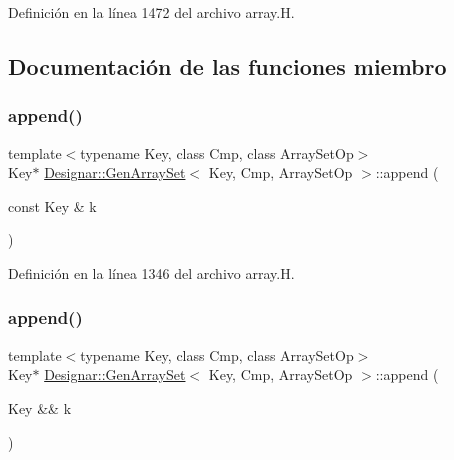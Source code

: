 Definición en la línea 1472 del archivo array.\+H.



\subsection{Documentación de las funciones miembro}
\mbox{\label{class_designar_1_1_gen_array_set_ac1367b0dd7bc3f90fc73101991dc398a}} 
\subsubsection{\texorpdfstring{append()}{append()}\hspace{0.1cm}{\footnotesize\ttfamily [1/2]}}
{\footnotesize\ttfamily template$<$typename Key, class Cmp, class Array\+Set\+Op$>$ \\
Key$\ast$ \hyperlink{class_designar_1_1_gen_array_set}{Designar\+::\+Gen\+Array\+Set}$<$ Key, Cmp, Array\+Set\+Op $>$\+::append (\begin{DoxyParamCaption}\item[{const Key \&}]{k }\end{DoxyParamCaption})\hspace{0.3cm}{\ttfamily [inline]}}



Definición en la línea 1346 del archivo array.\+H.

\mbox{\label{class_designar_1_1_gen_array_set_aafb9d33d1a9a6f5b07d434705290b7bc}} 
\subsubsection{\texorpdfstring{append()}{append()}\hspace{0.1cm}{\footnotesize\ttfamily [2/2]}}
{\footnotesize\ttfamily template$<$typename Key, class Cmp, class Array\+Set\+Op$>$ \\
Key$\ast$ \hyperlink{class_designar_1_1_gen_array_set}{Designar\+::\+Gen\+Array\+Set}$<$ Key, Cmp, Array\+Set\+Op $>$\+::append (\begin{DoxyParamCaption}\item[{Key \&\&}]{k }\end{DoxyParamCaption})\hspace{0.3cm}{\ttfamily [inline]}}




